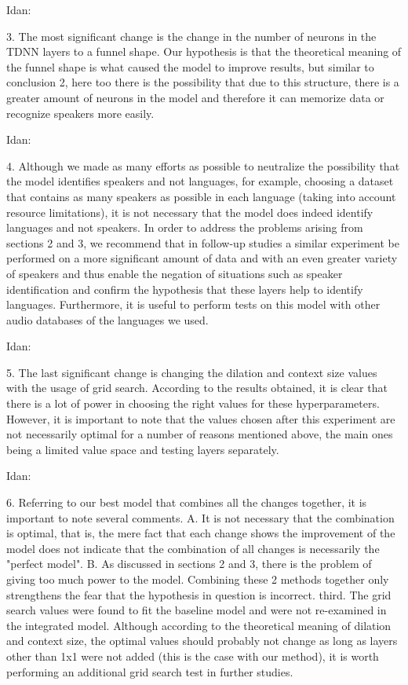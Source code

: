 \documentclass[a4paper]{article}
\begin{document}
Idan:

3. The most significant change is the change in the number of neurons in the TDNN layers to a funnel shape. Our hypothesis is that the theoretical meaning of the funnel shape is what caused the model to improve results, but similar to conclusion 2, here too there is the possibility that due to this structure, there is a greater amount of neurons in the model and therefore it can memorize data or recognize speakers more easily.

Idan:

4. Although we made as many efforts as possible to neutralize the possibility that the model identifies speakers and not languages, for example, choosing a dataset that contains as many speakers as possible in each language (taking into account resource limitations), it is not necessary that the model does indeed identify languages and not speakers. In order to address the problems arising from sections 2 and 3, we recommend that in follow-up studies a similar experiment be performed on a more significant amount of data and with an even greater variety of speakers and thus enable the negation of situations such as speaker identification and confirm the hypothesis that these layers help to identify languages. Furthermore, it is useful to perform tests on this model with other audio databases of the languages we used.

Idan:

5. The last significant change is changing the dilation and context size values with the usage of grid search. According to the results obtained, it is clear that there is a lot of power in choosing the right values for these hyperparameters. However, it is important to note that the values chosen after this experiment are not necessarily optimal for a number of reasons mentioned above, the main ones being a limited value space and testing layers separately.

Idan:

6. Referring to our best model that combines all the changes together, it is important to note several comments. A. It is not necessary that the combination is optimal, that is, the mere fact that each change shows the improvement of the model does not indicate that the combination of all changes is necessarily the "perfect model". B. As discussed in sections 2 and 3, there is the problem of giving too much power to the model. Combining these 2 methods together only strengthens the fear that the hypothesis in question is incorrect. third. The grid search values were found to fit the baseline model and were not re-examined in the integrated model. Although according to the theoretical meaning of dilation and context size, the optimal values should probably not change as long as layers other than 1x1 were not added (this is the case with our method), it is worth performing an additional grid search test in further studies.
\end{document}
